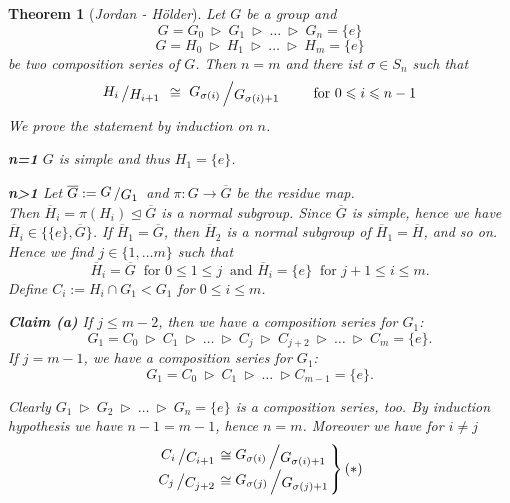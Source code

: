 \documentclass[11pt]{book}
\newtheorem{theorem}{Theorem}[section]
\theoremstyle{nonumberbreak}
\newenvironment{pr}[1][]{\ifthenelse{\equal{#1}{}}{\proof}{\proof[#1]}\rm}{\endproof}
\newcommand{\slant}[2]{{\raisebox{.1em}{$#1$}\left/\raisebox{-.1em}{$#2$}\right.}}
\begin{document}
\begin{spacing}{1.3}
\begin{theorem}[\rm \it Jordan - Hölder]
Let $G$ be a group and
$$G=G_0 \ \triangleright \ G_1 \ \triangleright \ \ldots \ \triangleright \ G_n = \{e\}$$
$$G=H_0 \ \triangleright \ H_1 \ \triangleright \ \ldots \ \triangleright \ H_m = \{e\}$$
be two composition series of $G$.
Then $n=m$ and there ist $\sigma \in S_n$ such that 
$$\slant{H_i}{H_{i+1}} \ \cong\ \slant{G_{\sigma(i)}}{G_{\sigma(i)+1}} \qquad \textrm{ for } 0 \leqslant i \leqslant n-1$$
\begin{pr}
We prove the statement by induction on $n$.
\begin{compactitem}
\item[\textbf{n=1}] $G$ is simple and thus $H_1= \{e\}$.
\item[\textbf{n>1}] Let $\overline{G}:= \slant{G}{G_1}$ and $\pi:G \longrightarrow \overline{G}$ be the residue map.\\
Then $\overline{H}_i= \pi(H_i) \trianglelefteq \overline{G}$ is a normal subgroup. Since $\overline{G}$ is simple, hence we have $\overline{H}_i \in \{\{e\}, \overline{G}\}$. If $\overline{H}_1=\overline{G}$, then $\overline{H}_2$ is a normal subgroup of $\overline{H}_1=\overline{H}$, and so on. Hence we find $j \in \{1, \ldots m \}$ such that
$$\overline{H}_i= \overline{G} \ \textrm{ for } 0 \leqslant 1 \leqslant j \ \textrm{ and } \overline{H}_i=\{e\} \ \textrm{ for } j+1 \leqslant i \leqslant m.$$
Define $C_i:=H_i \cap G_1 < G_1 $ for $0 \leqslant i \leqslant m$. 
\begin{compactenum}
\item[\textbf{Claim (a)}] If $j \leqslant m-2$, then we have a composition series for $G_1$:
$$G_1=C_0 \ \triangleright \ C_1 \ \triangleright \ \ldots \ \triangleright \ C_j \ \triangleright \ C_{j+2} \ \triangleright \ \ldots \ \triangleright \ C_m= \{e\}.$$
If $j=m-1$, we have a composition series for $G_1$:
$$G_1=C_0 \ \triangleright \ C_1 \ \triangleright \ \ldots \ \triangleright C_{m-1}=\{e\}.$$
\end{compactenum}
Clearly $G_1 \ \triangleright \ G_2 \ \triangleright \ \ldots \ \triangleright \ G_n =\{e\}$ is a composition series, too.
By induction hypothesis we have $n-1=m-1$, hence $n=m$. Moreover we have for $i \neq j$
$$\left.\begin{matrix} \slant{C_i}{C_{i+1}} \cong \slant{G_{\sigma(i)}}{G_{\sigma(i)+1}} \\ \slant{C_j}{C_{j+2}} \cong \slant{G_{\sigma(j)}}{G_{\sigma(j)+1}} \end{matrix} \right\} (*)$$

\end{compactitem}
\end{pr}
\end{theorem}
\end{spacing}
\end{document}
